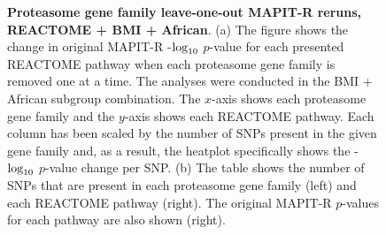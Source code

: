 \documentclass[12pt,a4paper]{article}
\def\log{{\rm log}}
\begin{document}
\begin{figure}[ht]
\caption[TBD]{\textbf{Proteasome gene family leave-one-out MAPIT-R reruns, REACTOME + BMI + African}. (a) The figure shows the change in original MAPIT-R -$\log_{10}$ $p$-value for each presented REACTOME pathway when each proteasome gene family is removed one at a time. The analyses were conducted in the BMI + African subgroup combination. The $x$-axis shows each proteasome gene family and the $y$-axis shows each REACTOME pathway. Each column has been scaled by the number of SNPs present in the given gene family and, as a result, the heatplot specifically shows the -$\log_{10}$ $p$-value change per SNP. (b) The table shows the number of SNPs that are present in each proteasome gene family (left) and each REACTOME pathway (right). The original MAPIT-R $p$-values for each pathway are also shown (right).}
\label{InterPath-Supp-Figure-Prot-Heatplots-African}
\end{figure}
\clearpage
\addtocounter{figure}{-1}
\addtocounter{CharNumber5}{1}

\end{document}

